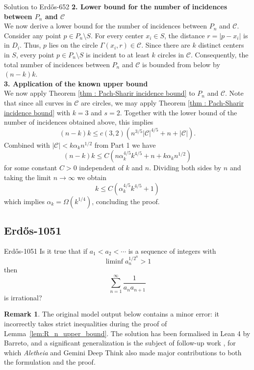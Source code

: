 \documentclass{article}
\theoremstyle{plain}
\theoremstyle{definition}
\newtheorem{remark}{Remark}[section]
\newcommand{\Aletheia}{\emph{Aletheia}}
\begin{document}
\begin{solution}{Solution to {Erdős-652}}
\textbf{2. Lower bound for the number of incidences between $P_n$ and $\mathcal{C}$}\\
We now derive a lower bound for the number of incidences between $P_n$ and $\mathcal{C}$. Consider any point $p \in P_n \setminus S$. For every center $x_i \in S$, the distance $r = |p - x_i|$ is in $D_i$. Thus, $p$ lies on the circle $\Gamma(x_i, r) \in \mathcal{C}$.
Since there are $k$ distinct centers in $S$, every point $p \in P_n \setminus S$ is incident to at least $k$ circles in $\mathcal{C}$.
Consequently, the total number of incidences between $P_n$ and $\mathcal{C}$ is bounded from below by $(n-k)k$.\\

\textbf{3. Application of the known upper bound}\\
We now apply Theorem \ref{thm : Pach-Sharir incidence bound} to $P_n$ and $\mathcal{C}$. Note that since all curves in $\mathcal{C}$ are circles, we may apply Theorem \ref{thm : Pach-Sharir incidence bound} with $k=3$ and $s=2$. Together with the lower bound of the number of incidences obtained above, this implies 
\[(n-k)k\leq c(3,2)\left(n^{3/5}|\mathcal{C}|^{4/5}+n+|\mathcal{C}|\right).\]
Combined with $|\mathcal{C}|<k\alpha_{k}n^{1/2}$ from Part 1 we have
\[(n-k)k\leq C\left(n\alpha_{k}^{4/5}k^{4/5}+n+k\alpha_{k}n^{1/2}\right)\]
for some constant $C>0$ independent of $k$ and $n$. Dividing both sides by $n$ and taking the limit $n\to\infty$ we obtain
\[k\leq C(\alpha_{k}^{4/5}k^{4/5}+1)\]
which implies $\alpha_{k}=\Omega(k^{1/4})$, concluding the proof.
\end{solution}




\subsection{Erdős-1051}

\begin{problem}{Erdős-1051 \cite{ErGr80, Er88}}   
Is it true that if $a_1<a_2<\cdots$ is a sequence of integers with\[\liminf a_n^{1/2^n}>1\]then\[\sum_{n=1}^\infty \frac{1}{a_na_{n+1}}\]is irrational?
\end{problem}

\begin{remark}
The original model output below contains a minor error: it incorrectly takes strict inequalities during the proof of Lemma~\ref{lem:R_n_upper_bound}. 
The solution has been formalised in Lean 4 by Barreto, and a significant generalization is the subject of follow-up work \cite{BKKKZ}, for which {\Aletheia} and Gemini Deep Think also made major contributions  to both the formulation and the proof. 
\end{remark}
\end{document}
